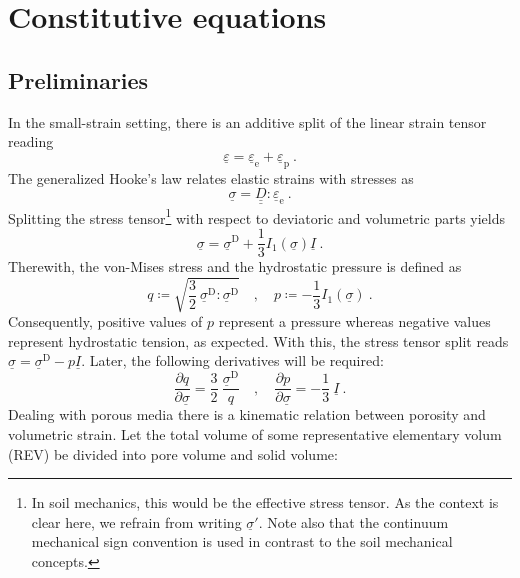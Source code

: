 \documentclass[paper=a4, twoside, pagesize]{scrartcl}
\newcommand{\tensor}[1]{\underline{#1}}
\newcommand{\tensorf}[1]{\underline{\underline{#1}}}
\newcommand{\ppkt}{\colon}
\newcommand{\D}{\text{D}}
\newcommand{\e}{\text{e}}
\newcommand{\p}{\text{p}}
\begin{document}
\section{Constitutive equations}

\subsection{Preliminaries}

In the small-strain setting, there is an additive split of the linear strain tensor reading
\begin{equation}\label{eq:elasticplastic}
  \tensor\varepsilon = \tensor\varepsilon_\e + \tensor\varepsilon_\p \ .
\end{equation}
The generalized Hooke's law relates elastic strains with stresses as
\begin{equation}\label{eq:Hooke}
  \tensor\sigma = \tensorf D \ppkt\tensor\varepsilon_\e \ .
\end{equation}
Splitting the stress tensor\footnote{In soil mechanics, this would be the effective stress tensor. As the context is clear here, we refrain from writing $\tensor\sigma'$. Note also that the continuum mechanical sign convention is used in contrast to the soil mechanical concepts.} with respect to deviatoric and volumetric parts yields
\begin{equation}\label{eq:decomposition}
  \tensor\sigma = \tensor\sigma ^\D + \frac{1}{3}I_1(\tensor\sigma)\tensor I \ .
\end{equation}
Therewith, the von-Mises stress and the hydrostatic pressure is defined as
\begin{equation}
  q \coloneqq \sqrt{\frac{3}{2}\ \tensor\sigma^\D\ppkt\tensor\sigma^\D} \quad,\quad p \coloneqq -\frac{1}{3}I_1(\tensor\sigma) \ .
\end{equation}
Consequently, positive values of $p$ represent a pressure whereas negative values represent hydrostatic tension, as expected.
With this, the stress tensor split reads $\tensor\sigma = \tensor\sigma^\D - p\tensor I$. Later, the following derivatives will be required:
\begin{equation}
  \frac{\partial q}{\partial \tensor\sigma} = \frac{3}{2}\ \frac{\tensor\sigma^\D}{q}\quad,\quad \frac{\partial p}{\partial \tensor\sigma} = -\frac{1}{3}\ \tensor I \ .
\end{equation}
Dealing with porous media there is a kinematic relation between porosity and volumetric strain. Let the total volume of some representative elementary volum (REV) be divided into pore volume and solid volume:
\end{document}
